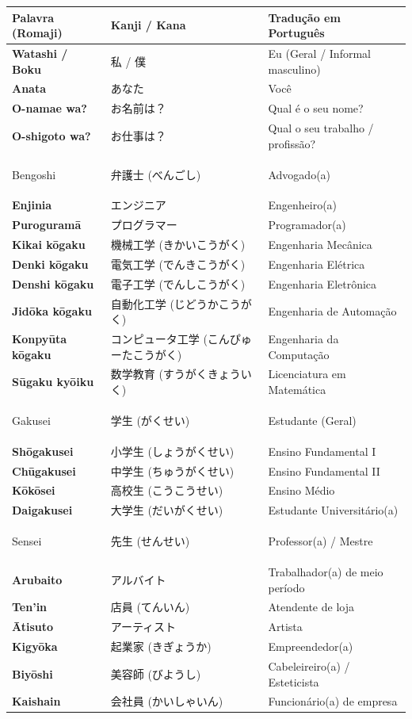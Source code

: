 \documentclass[12pt,a4paper]{article}
\begin{document}
\noindent
\small
\begin{tabularx}{\textwidth}{>{\bfseries\color{jpnavy}}l X X}
\toprule
Palavra (Romaji) & Kanji / Kana & Tradução em Português \\
\midrule
Watashi / Boku & 私 / 僕 & Eu (Geral / Informal masculino) \\
Anata & あなた & Você \\
O-namae wa? & お名前は？ & Qual é o seu nome? \\
O-shigoto wa? & お仕事は？ & Qual o seu trabalho / profissão? \\
\midrule

Bengoshi & 弁護士 (べんごし) & Advogado(a) \\
Enjinia & エンジニア & Engenheiro(a) \\
Puroguramā & プログラマー & Programador(a) \\
Kikai kōgaku & 機械工学 (きかいこうがく) & Engenharia Mecânica \\
Denki kōgaku & 電気工学 (でんきこうがく) & Engenharia Elétrica \\
Denshi kōgaku & 電子工学 (でんしこうがく) & Engenharia Eletrônica \\
Jidōka kōgaku & 自動化工学 (じどうかこうがく) & Engenharia de Automação \\
Konpyūta kōgaku & コンピュータ工学 (こんぴゅーたこうがく) & Engenharia da Computação \\
Sūgaku kyōiku & 数学教育 (すうがくきょういく) & Licenciatura em Matemática \\
\midrule

Gakusei & 学生 (がくせい) & Estudante (Geral) \\
Shōgakusei & 小学生 (しょうがくせい) & Ensino Fundamental I \\
Chūgakusei & 中学生 (ちゅうがくせい) & Ensino Fundamental II \\
Kōkōsei & 高校生 (こうこうせい) & Ensino Médio \\
Daigakusei & 大学生 (だいがくせい) & Estudante Universitário(a) \\
\midrule

Sensei & 先生 (せんせい) & Professor(a) / Mestre \\
Arubaito & アルバイト & Trabalhador(a) de meio período \\
Ten'in & 店員 (てんいん) & Atendente de loja \\
Ātisuto & アーティスト & Artista \\
Kigyōka & 起業家 (きぎょうか) & Empreendedor(a) \\
Biyōshi & 美容師 (びようし) & Cabeleireiro(a) / Esteticista \\
Kaishain & 会社員 (かいしゃいん) & Funcionário(a) de empresa \\
\bottomrule
\end{tabularx}
\end{document}
